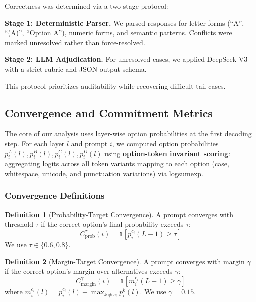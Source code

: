 \documentclass[11pt]{article}
\theoremstyle{definition}
\newtheorem{definition}{Definition}[section]
\begin{document}
Correctness was determined via a two-stage protocol:

\textbf{Stage 1: Deterministic Parser.} We parsed responses for letter forms (``A'', ``(A)'', ``Option A''), numeric forms, and semantic patterns. Conflicts were marked unresolved rather than force-resolved.

\textbf{Stage 2: LLM Adjudication.} For unresolved cases, we applied DeepSeek-V3 \citep{deepseek2024} with a strict rubric and JSON output schema.

This protocol prioritizes auditability while recovering difficult tail cases.

\subsection{Convergence and Commitment Metrics}

The core of our analysis uses layer-wise option probabilities at the first decoding step. For each layer $l$ and prompt $i$, we computed option probabilities $p_i^A(l), p_i^B(l), p_i^C(l), p_i^D(l)$ using \textbf{option-token invariant scoring}: aggregating logits across all token variants mapping to each option (case, whitespace, unicode, and punctuation variations) via logsumexp.

\subsubsection{Convergence Definitions}

\begin{definition}[Probability-Target Convergence]
A prompt converges with threshold $\tau$ if the correct option's final probability exceeds $\tau$:
\begin{equation}
C_{\text{prob}}^\tau(i) = \mathbb{1}[p_i^{c_i}(L-1) \geq \tau]
\end{equation}
We use $\tau \in \{0.6, 0.8\}$.
\end{definition}

\begin{definition}[Margin-Target Convergence]
A prompt converges with margin $\gamma$ if the correct option's margin over alternatives exceeds $\gamma$:
\begin{equation}
C_{\text{margin}}^\gamma(i) = \mathbb{1}[m_i^{c_i}(L-1) \geq \gamma]
\end{equation}
where $m_i^{c_i}(l) = p_i^{c_i}(l) - \max_{k \neq c_i} p_i^k(l)$. We use $\gamma = 0.15$.
\end{definition}
\end{document}
